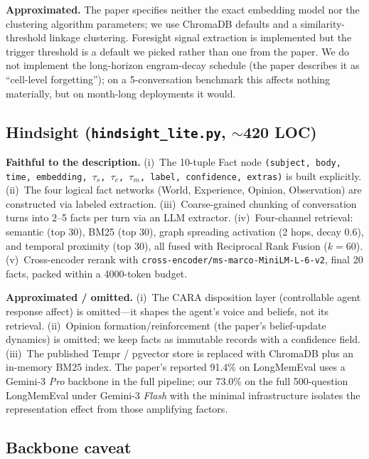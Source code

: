 \textbf{Approximated.} The paper specifies neither the exact embedding model nor the clustering algorithm parameters; we use ChromaDB defaults and a similarity-threshold linkage clustering. Foresight signal extraction is implemented but the trigger threshold is a default we picked rather than one from the paper. We do not implement the long-horizon engram-decay schedule (the paper describes it as ``cell-level forgetting''); on a 5-conversation benchmark this affects nothing materially, but on month-long deployments it would.

\subsection{Hindsight (\texttt{hindsight\_lite.py}, \texorpdfstring{$\sim$420}{\textasciitilde 420} LOC)}

\textbf{Faithful to the description.} (i)~The 10-tuple Fact node \texttt{(subject, body, time, embedding, $\tau_s$, $\tau_e$, $\tau_m$, label, confidence, extras)} is built explicitly. (ii)~The four logical fact networks (World, Experience, Opinion, Observation) are constructed via labeled extraction. (iii)~Coarse-grained chunking of conversation turns into 2--5 facts per turn via an LLM extractor. (iv)~Four-channel retrieval: semantic (top 30), BM25 (top 30), graph spreading activation (2 hops, decay 0.6), and temporal proximity (top 30), all fused with Reciprocal Rank Fusion ($k{=}60$). (v)~Cross-encoder rerank with \texttt{cross-encoder/ms-marco-MiniLM-L-6-v2}, final 20 facts, packed within a 4000-token budget.

\textbf{Approximated / omitted.} (i)~The CARA disposition layer (controllable agent response affect) is omitted---it shapes the agent's voice and beliefs, not its retrieval. (ii)~Opinion formation/reinforcement (the paper's belief-update dynamics) is omitted; we keep facts as immutable records with a confidence field. (iii)~The published Tempr / pgvector store is replaced with ChromaDB plus an in-memory BM25 index. The paper's reported 91.4\% on LongMemEval uses a Gemini-3 \emph{Pro} backbone in the full pipeline; our 73.0\% on the full 500-question LongMemEval under Gemini-3 \emph{Flash} with the minimal infrastructure isolates the representation effect from those amplifying factors.

\subsection{Backbone caveat}

